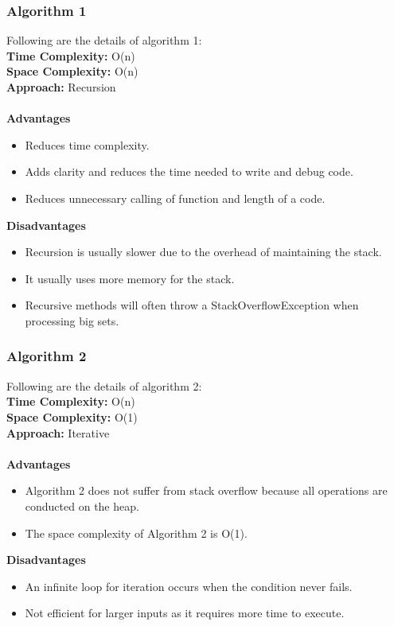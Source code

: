 \documentclass[a4paper,12pt]{article}
\begin{document}
    \subsubsection{Algorithm 1}
    Following are the details of algorithm 1: \\
    \textbf{Time Complexity:} O(n) \\
    \textbf{Space Complexity:} O(n) \\
    \textbf{Approach:} Recursion \\ \\
    \textbf{Advantages}
    \begin{itemize}
        \item Reduces time complexity.
        \item Adds clarity and reduces the time needed to write and debug code.
        \item Reduces unnecessary calling of function and length of a code.
    \end{itemize}
    \textbf{Disadvantages}
    \begin{itemize}
        \item Recursion is usually slower due to the overhead of maintaining the stack.
        \item It usually uses more memory for the stack.
        \item Recursive methods will often throw a StackOverflowException when processing big sets.
    \end{itemize}

    \subsubsection{Algorithm 2}
    Following are the details of algorithm 2: \\
    \textbf{Time Complexity:} O(n) \\
    \textbf{Space Complexity:} O(1) \\
    \textbf{Approach:} Iterative \\ \\
    \textbf{Advantages}
    \begin{itemize}
        \item Algorithm 2 does not suffer from stack overflow because all operations are conducted on the heap.
        \item The space complexity of Algorithm 2 is O(1).
    \end{itemize}
    \textbf{Disadvantages}
    \begin{itemize}
        \item An infinite loop for iteration occurs when the condition never fails.
        \item Not efficient for larger inputs as it requires more time to execute.
    \end{itemize}
\end{document}
